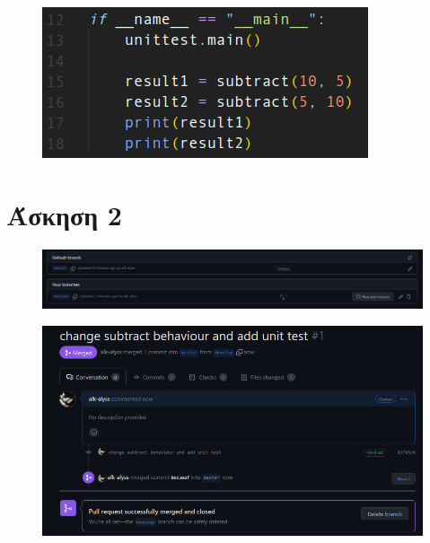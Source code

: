 \documentclass{article}
\begin{document}
	\begin{figure}[H]
		\includegraphics[width=\textwidth]{"5.png"}
	\end{figure}

\section*{Άσκηση 2}
	\begin{figure}[H]
		\includegraphics[width=\textwidth]{"6.png"}
	\end{figure}
	\begin{figure}[H]
		\includegraphics[width=\textwidth]{"7.png"}
	\end{figure}
\end{document}

